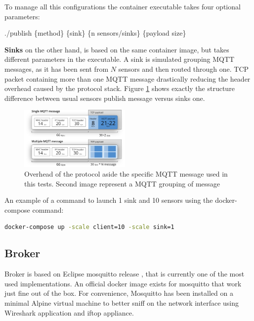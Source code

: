 \documentclass[journal]{IEEEtran}
\begin{document}
To manage all this configurations the container executable takes four optional parameters:

\begin{center}
	./publish \{method\} \{sink\} \{n sensors/sinks\} \{payload size\}
\end{center}

\textbf{Sinks} on the other hand, is based on the same container image, but takes different parameters in the executable. A sink is simulated grouping MQTT messages, as it has been sent from $N$ sensors and then routed through one. TCP packet containing more than one MQTT message drastically reducing the header overhead caused by the protocol stack. Figure \ref{fig:overhead} shows exactly the structure difference between usual sensors publish message versus sinks one. 

\begin{figure}[h]
	\centering
	\includegraphics[width=0.48\textwidth]{mqtt_3}
	\caption{Overhead of the protocol aside the specific MQTT message used in this tests. Second image represent a MQTT grouping of message}
	\label{fig:overhead}
\end{figure}

An example of a command to launch 1 sink and 10 sensors using the docker-compose command: 

\begin{lstlisting}[language=bash, caption={Docker-compose launch command}]
docker-compose up -scale client=10 -scale sink=1
\end{lstlisting}

\subsection{Broker}
Broker is based on Eclipse mosquitto release \cite{mosquitto}, that is currently one of the most used implementations. 
An official docker image exists for mosquitto that work just fine out of the box. 
For convenience, Mosquitto has been installed on a minimal Alpine virtual machine to better sniff on the network interface using Wireshark application and iftop appliance. 
\end{document}
